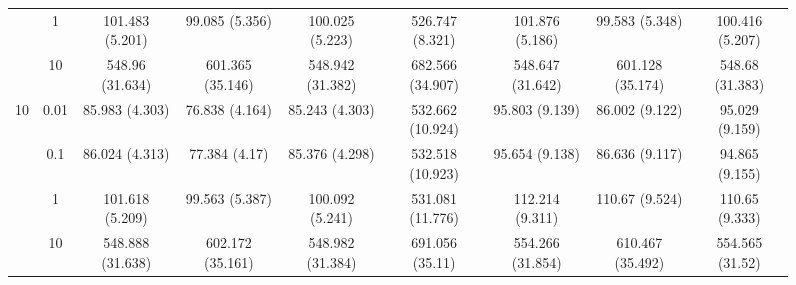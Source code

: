 \documentclass[11pt]{article}
\theoremstyle{definition}
\begin{document}
\begin{sidewaysfigure}
\begin{tabular}{cc|ccc|cccc}
    & 1 & 101.483 (5.201) & 99.085 (5.356) & 100.025 (5.223) & 526.747 (8.321) & 101.876 (5.186) & 99.583 (5.348) & 100.416 (5.207) \\ 
    & 10 & 548.96 (31.634) & 601.365 (35.146) & 548.942 (31.382) & 682.566 (34.907) & 548.647 (31.642) & 601.128 (35.174) & 548.68 (31.383) \\[.3cm]  
   \multirow{4}{*}{10} & 0.01 & 85.983 (4.303) & 76.838 (4.164) & 85.243 (4.303) & 532.662 (10.924) & 95.803 (9.139) & 86.002 (9.122) & 95.029 (9.159) \\ 
    & 0.1 & 86.024 (4.313) & 77.384 (4.17) & 85.376 (4.298) & 532.518 (10.923) & 95.654 (9.138) & 86.636 (9.117) & 94.865 (9.155) \\ 
    & 1 & 101.618 (5.209) & 99.563 (5.387) & 100.092 (5.241) & 531.081 (11.776) & 112.214 (9.311) & 110.67 (9.524) & 110.65 (9.333) \\ 
    & 10 & 548.888 (31.638) & 602.172 (35.161) & 548.982 (31.384) & 691.056 (35.11) & 554.266 (31.854) & 610.467 (35.492) & 554.565 (31.52) \\ 
\end{tabular}
\end{sidewaysfigure}
\end{document}
